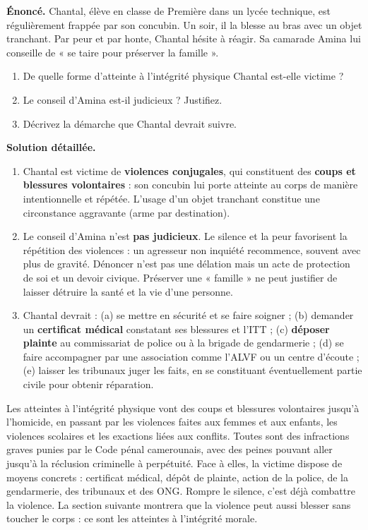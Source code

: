 \documentclass[11pt]{article}
\begin{document}
\begin{exoresolu}
\textbf{Énoncé.} Chantal, élève en classe de Première dans un lycée technique, est régulièrement frappée par son concubin. Un soir, il la blesse au bras avec un objet tranchant. Par peur et par honte, Chantal hésite à réagir. Sa camarade Amina lui conseille de « se taire pour préserver la famille ».
\begin{enumerate}
\item De quelle forme d'atteinte à l'intégrité physique Chantal est-elle victime ?
\item Le conseil d'Amina est-il judicieux ? Justifiez.
\item Décrivez la démarche que Chantal devrait suivre.
\end{enumerate}
\tcblower
\textbf{Solution détaillée.}
\begin{enumerate}
\item Chantal est victime de \textbf{violences conjugales}, qui constituent des \textbf{coups et blessures volontaires} : son concubin lui porte atteinte au corps de manière intentionnelle et répétée. L'usage d'un objet tranchant constitue une circonstance aggravante (arme par destination).
\item Le conseil d'Amina n'est \textbf{pas judicieux}. Le silence et la peur favorisent la répétition des violences : un agresseur non inquiété recommence, souvent avec plus de gravité. Dénoncer n'est pas une délation mais un acte de protection de soi et un devoir civique. Préserver une « famille » ne peut justifier de laisser détruire la santé et la vie d'une personne.
\item Chantal devrait : (a) se mettre en sécurité et se faire soigner ; (b) demander un \textbf{certificat médical} constatant ses blessures et l'ITT ; (c) \textbf{déposer plainte} au commissariat de police ou à la brigade de gendarmerie ; (d) se faire accompagner par une association comme l'ALVF ou un centre d'écoute ; (e) laisser les tribunaux juger les faits, en se constituant éventuellement partie civile pour obtenir réparation.
\end{enumerate}
\end{exoresolu}

\begin{aretenir}
Les atteintes à l'intégrité physique vont des coups et blessures volontaires jusqu'à l'homicide, en passant par les violences faites aux femmes et aux enfants, les violences scolaires et les exactions liées aux conflits. Toutes sont des infractions graves punies par le Code pénal camerounais, avec des peines pouvant aller jusqu'à la réclusion criminelle à perpétuité. Face à elles, la victime dispose de moyens concrets : certificat médical, dépôt de plainte, action de la police, de la gendarmerie, des tribunaux et des ONG. Rompre le silence, c'est déjà combattre la violence. La section suivante montrera que la violence peut aussi blesser sans toucher le corps : ce sont les atteintes à l'intégrité morale.
\end{aretenir}
\end{document}
